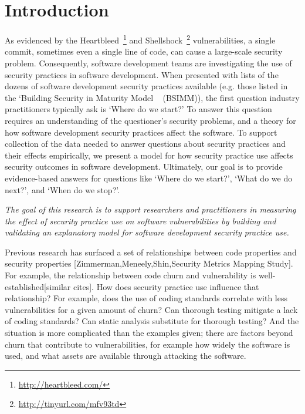 \section{Introduction}
\label{sec:intro}

As evidenced by the Heartbleed~\footnote{\url{http://heartbleed.com/}} and Shellshock~\footnote{\url{http://tinyurl.com/mfv93td}} vulnerabilities, a single commit, sometimes even a single line of code, can cause a large-scale security problem.  Consequently, software development teams are investigating the use of security practices in software development. When presented with lists of the dozens of software development security practices available (e.g. those listed in the `Building Security in Maturity Model ~\cite{mcgraw2013bsimm} (BSIMM)), the first question industry practitioners typically ask is `Where do we start?'  To answer this question requires an understanding of the questioner's security problems, and a theory for how software development security practices affect the software. To support collection of the data needed to answer  questions about security practices and their effects empirically, we present a model for how security practice use affects security outcomes in software development.  Ultimately, our goal is to provide evidence-based answers for questions like `Where do we start?', `What do we do next?', and `When do we stop?'.

 \textit{The goal of this research is to support researchers and practitioners in measuring the effect of security practice use on software vulnerabilities by building and validating an explanatory model for software development security practice use.}
 
Previous research has surfaced a set of relationships between code properties and security properties [Zimmerman,Meneely,Shin,Security Metrics Mapping Study]. For example, the relationship between code churn and vulnerability is well-established[similar cites]. How does security practice use influence that relationship?  For example, does the use of coding standards correlate with less vulnerabilities for a given amount of churn? Can thorough testing mitigate a lack of coding standards? Can static analysis substitute for thorough testing? And the situation is more complicated than the examples given; there are factors beyond churn that contribute to vulnerabilities, for example how widely the software is used, and what assets are available through attacking the software.
 
